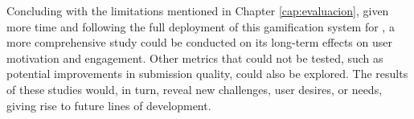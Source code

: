 Concluding with the limitations mentioned in Chapter \ref{cap:evaluacion}, given more time and following the full deployment of this gamification system for \aer, a more comprehensive study could be conducted on its long-term effects on user motivation and engagement. Other metrics that could not be tested, such as potential improvements in submission quality, could also be explored. The results of these studies would, in turn, reveal new challenges, user desires, or needs, giving rise to future lines of development.